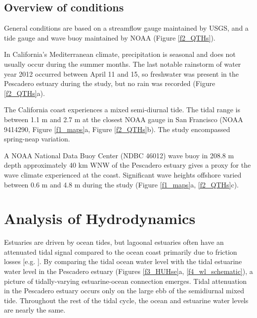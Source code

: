 \subsection{Overview of conditions\label{sub:ext_cond}}

General conditions are based on a streamflow gauge maintained by USGS,
and a tide gauge and wave buoy maintained by NOAA (Figure \ref{f2_QTHs}). 

In California's Mediterranean climate, precipitation is seasonal and
does not usually occur during the summer months. The last notable
rainstorm of water year 2012 occurred between April 11 and 15, so
freshwater was present in the Pescadero estuary during the study,
but no rain was recorded (Figure \ref{f2_QTHs}a). 

The California coast experiences a mixed semi-diurnal tide. The tidal
range is between 1.1 m and 2.7 m at the closest NOAA gauge in San
Francisco (NOAA 9414290, Figure \ref{f1_maps}a, Figure \ref{f2_QTHs}b).
The study encompassed spring-neap variation.

A NOAA National Data Buoy Center (NDBC 46012) wave buoy in
208.8 m depth approximately 40 km WNW of the Pescadero estuary gives
a proxy for the wave climate experienced at the coast. Significant
wave heights offshore varied between 0.6 m and 4.8 m during the study
(Figure \ref{f1_maps}a, \ref{f2_QTHs}c). 





\section{Analysis of Hydrodynamics}

Estuaries are driven by ocean tides, but lagoonal estuaries often
have an attenuated tidal signal compared to the ocean coast primarily
due to friction losses {[}e.g. \parencite{rydberg_tidal_1996}{]}.
By comparing the tidal ocean water level with the tidal estuarine
water level in the Pescadero estuary (Figures \ref{f3_HUHse}a, \ref{f4_wl_schematic}),
a picture of tidally-varying estuarine-ocean connection emerges. Tidal
attenuation in the Pescadero estuary occurs only on the large ebb
of the semidiurnal mixed tide. Throughout the rest of the tidal cycle,
the ocean and estuarine water levels are nearly the same.


